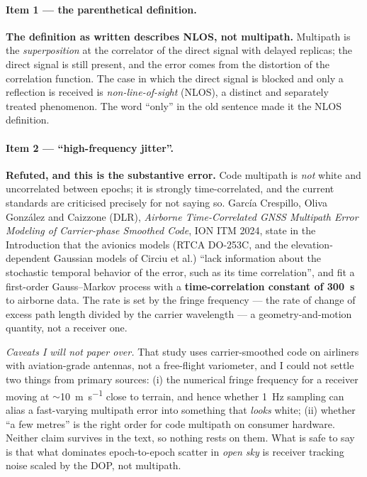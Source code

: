 \documentclass[11pt,a4paper]{article}
\newcommand{\verdict}[1]{\textbf{\textcolor{vbad}{#1}}}
\begin{document}
\paragraph{Item 1 --- the parenthetical definition.} \verdict{The definition as written
describes NLOS, not multipath.} Multipath is the \emph{superposition} at the correlator of
the direct signal with delayed replicas; the direct signal is still present, and the error
comes from the distortion of the correlation function. The case in which the direct signal
is blocked and only a reflection is received is \emph{non-line-of-sight} (NLOS), a distinct
and separately treated phenomenon. The word \enquote{only} in the old sentence made it the
NLOS definition.

\paragraph{Item 2 --- \enquote{high-frequency jitter}.} \verdict{Refuted, and this is the
substantive error.} Code multipath is \emph{not} white and uncorrelated between epochs; it
is strongly time-correlated, and the current standards are criticised precisely for not
saying so. Garc\'ia Crespillo, Oliva Gonz\'alez and Caizzone (DLR), \emph{Airborne
Time-Correlated GNSS Multipath Error Modeling of Carrier-phase Smoothed Code}, ION ITM
2024, state in the Introduction that the avionics models (RTCA DO-253C, and the
elevation-dependent Gaussian models of Circiu et al.) \enquote{lack information about the
stochastic temporal behavior of the error, such as its time correlation}, and fit a
first-order Gauss--Markov process with a \textbf{time-correlation constant of
\SI{300}{\second}} to airborne data. The rate is set by the fringe frequency --- the rate
of change of excess path length divided by the carrier wavelength --- a
geometry-and-motion quantity, not a receiver one.

\emph{Caveats I will not paper over.} That study uses carrier-smoothed code on airliners
with aviation-grade antennas, not a free-flight variometer, and I could not settle two
things from primary sources: (i) the numerical fringe frequency for a receiver moving at
$\sim$\SI{10}{\metre\per\second} close to terrain, and hence whether \SI{1}{\hertz}
sampling can alias a fast-varying multipath error into something that \emph{looks} white;
(ii) whether \enquote{a few metres} is the right order for code multipath on consumer
hardware. Neither claim survives in the text, so nothing rests on them. What is safe to
say is that what dominates epoch-to-epoch scatter in \emph{open sky} is receiver tracking
noise scaled by the DOP, not multipath.
\end{document}

